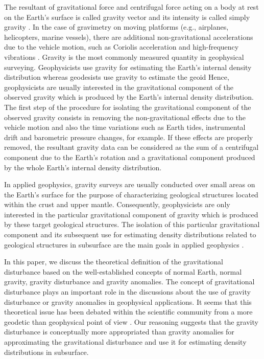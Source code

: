 \documentclass[paper,twocolumn,twoside]{geophysics}
\begin{document}
The resultant of gravitational force and centrifugal force acting 
on a body at rest on the Earth's surface is called gravity vector
and its intensity is called simply gravity 
\citep{hofmann-wellenhof-moritz2005}.
In the case of gravimetry on moving platforms (e.g., airplanes,
helicopters, marine vessels), there are additional
non-gravitational accelerations due to the vehicle motion, 
such as Coriolis acceleration and high-frequency vibrations 
\citep{glennie-etal2000, nabighian-etal2005-grav, baumann_etal2012}.
Gravity is the most commonly measured quantity in
geophysical surveying.
Geophysicists use gravity for estimating the Earth's 
internal density distribution whereas geodesists use
gravity to estimate the geoid \citep{li2001}
Hence, geophysicists are usually interested 
in the gravitational component of the observed gravity 
which is produced by the Earth's internal 
density distribution.
The first step of the procedure for isolating the
gravitational component of the observed gravity 
consists in removing the non-gravitational effects due 
to the vehicle motion and also the time variations
such as Earth tides, instrumental drift and barometric 
pressure changes, for example.
If these effects are properly removed, the resultant 
gravity data can be considered as the sum of a 
centrifugal component due to the Earth's rotation and
a gravitational component produced by the whole Earth's
internal density distribution.

In applied geophysics, gravity surveys are usually conducted 
over small areas on the Earth's surface for the purpose of 
characterizing geological structures located within the
crust and upper mantle.
Consequently, geophysicists are only interested in the
particular gravitational component of gravity which 
is produced by these target geological structures.
The isolation of this particular gravitational component 
and its subsequent use for estimating density 
distributions related to geological structures in subsurface 
are the main goals in applied geophysics 
\citep{blakely1996}.

In this paper, we discuss the theoretical definition
of the gravitational disturbance based on the 
well-established concepts of normal Earth, normal gravity, 
gravity disturbance and gravity anomalies.
The concept of gravitational disturbance plays an
important role in the discussions about 
the use of gravity disturbance or gravity anomalies
in geophysical applications.
It seems that this theoretical issue has been 
debated within the scientific community from a 
more geodetic than geophysical point of view
\citep{lafehr1991, chapin1996, li2001, fairhead2003,
hackney-featherstone2003, hinze2005}.
Our reasoning suggests that the gravity 
disturbance is conceptually more appropriated than 
gravity anomalies for approximating
the gravitational disturbance and use it for estimating 
density distributions in subsurface.
\end{document}

